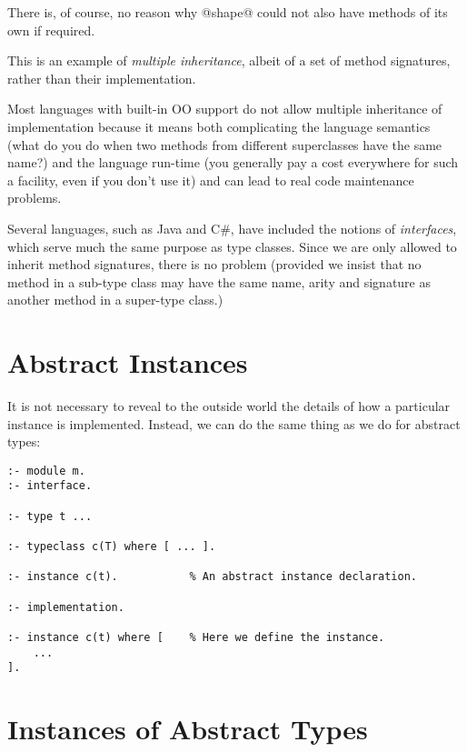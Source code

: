 There is, of course, no reason why @shape@ could not also have methods
of its own if required.

This is an example of \emph{multiple inheritance}, albeit of a set of
method signatures, rather than their implementation.

Most languages with built-in OO support do not allow multiple
inheritance of implementation because it means both complicating the
language semantics (what do you do when two methods from different
superclasses have the same name?) and the language run-time (you
generally pay a cost everywhere for such a facility, even if you don't
use it) and can lead to real code maintenance problems.

Several languages, such as Java and C#, have included the notions of
\emph{interfaces}, which serve much the same purpose as type classes.
Since we are only allowed to inherit method signatures, there is no
problem (provided we insist that no method in a sub-type class may have the
same name, arity and signature as another method in a super-type class.)

\section{Abstract Instances}

It is not necessary to reveal to the outside world the details of how a
particular instance is implemented.  Instead, we can do the same thing
as we do for abstract types:
\begin{verbatim}
:- module m.
:- interface.

:- type t ...

:- typeclass c(T) where [ ... ].

:- instance c(t).           % An abstract instance declaration.

:- implementation.

:- instance c(t) where [    % Here we define the instance.
    ...
].
\end{verbatim}

\section{Instances of Abstract Types}

